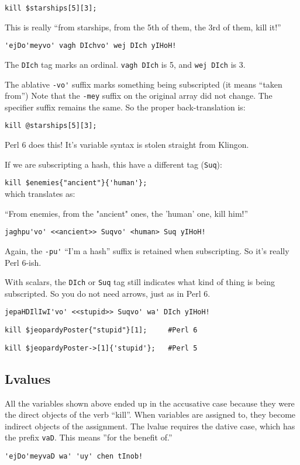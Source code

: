 \documentclass{article}
\begin{document}
\verb"kill $starships[5][3];"

This is really
``from starships, from the 5th of them, the 3rd of them, kill it!''

\verb"'ejDo'meyvo' vagh DIchvo' wej DIch yIHoH!"

The \verb'DIch' tag marks an ordinal.
\verb'vagh DIch' is 5, and \verb'wej DIch' is 3.

The ablative \verb"-vo'" suffix marks something being 
subscripted (it means ``taken from'')
Note that the \verb"-mey" suffix on the original array did not change.  
The specifier suffix remains the same.  So the proper back-translation 
is:

\verb"kill @starships[5][3];"

\noindent Perl 6 does this!  It's variable syntax is stolen straight 
from Klingon.

If we are subscripting a hash, this have a different tag (\verb'Suq'):

\verb^kill $enemies{"ancient"}{'human'};^\\
which translates as:

``From enemies, from the "ancient" ones, the 'human' one, kill him!''

\verb"jaghpu'vo' <<ancient>> Suqvo' <human> Suq yIHoH!"

Again, the \verb"-pu'" ``I'm a hash'' suffix is retained when 
subscripting.  So it's really Perl 6-ish.

With scalars, the \verb'DIch' or \verb'Suq' tag still indicates what 
kind of thing is being subscripted.  So you do not need arrows, just 
as in Perl 6.

\verb"jepaHDIlIwI'vo' <<stupid>> Suqvo' wa' DIch yIHoH!"

\verb^kill $jeopardyPoster{"stupid"}[1];     #Perl 6^

\verb"kill $jeopardyPoster->[1]{'stupid'};   #Perl 5"

\subsection{Lvalues}
All the variables shown above ended up in the accusative case because
they were the direct objects of the verb ``kill''.  When variables are 
assigned to,
they become indirect objects of the assignment.  The lvalue requires the
dative case, which has the prefix \verb"vaD".  This means 
''for the benefit of.''

\verb"'ejDo'meyvaD wa' 'uy' chen tInob!"
\end{document}
